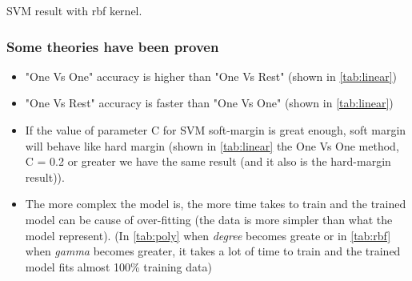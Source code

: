 \pagebreak
\begin{table}[h!]
  \begin{center}
    \label{rbf}
    \caption{SVM result with rbf kernel.}
  \end{center}
\end{table}

\subsubsection*{Some theories have been proven}
\begin{itemize}
\item "One Vs One" accuracy is higher than "One Vs Rest" (shown in \ref{tab:linear})
\item "One Vs Rest" accuracy is faster than "One Vs One" (shown in \ref{tab:linear})
\item If the value of parameter C for SVM soft-margin is great enough, soft margin will behave like hard margin (shown in \ref{tab:linear} the One Vs One method, C = 0.2 or greater we have the same result (and it also is the hard-margin result)).
\item The more complex the model is, the more time takes to train and the trained model can be cause of over-fitting (the data is more simpler than what the model represent). (In \ref{tab:poly} when \textit{degree} becomes greate or in \ref{tab:rbf} when \textit{gamma} becomes greater, it takes a lot of time to train and the trained model fits almost 100\% training data)
\end{itemize}